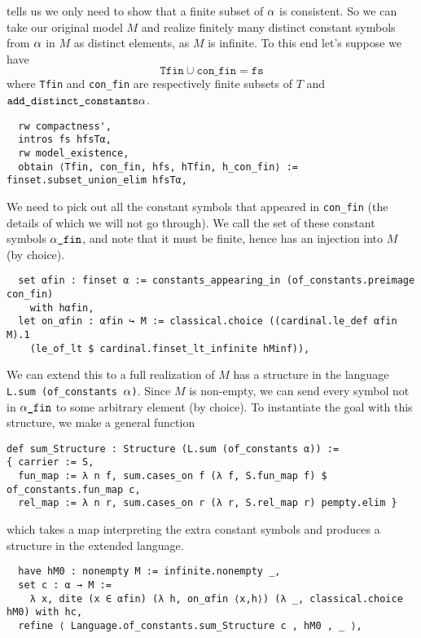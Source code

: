  tells us we only
need to show that a finite subset of $\alpha$ is consistent.
So we can take our original model $M$ and realize finitely many
distinct constant symbols from $\alpha$ in $M$ as distinct elements,
as $M$ is infinite.
To this end let's suppose we have
\[\texttt{Tfin} \cup \texttt{con\_fin} = \texttt{fs}\]
where \texttt{Tfin} and \texttt{con\_fin} are respectively
finite subsets of $T$ and $\texttt{add\_distinct\_constants} \alpha$.

\begin{lstlisting}
  rw compactness',
  intros fs hfsTα,
  rw model_existence,
  obtain ⟨Tfin, con_fin, hfs, hTfin, h_con_fin⟩ := finset.subset_union_elim hfsTα, \end{lstlisting}

We need to pick out all the constant symbols that appeared in
\texttt{con\_fin} (the details of which we will not go through).
We call the set of these constant symbols $\alpha\texttt{\_fin}$,
and note that it must be finite,
hence has an injection into $M$ (by choice).



\begin{lstlisting}
  set αfin : finset α := constants_appearing_in (of_constants.preimage con_fin)
    with hαfin,
  let on_αfin : αfin ↪ M := classical.choice ((cardinal.le_def αfin M).1
    (le_of_lt $ cardinal.finset_lt_infinite hMinf)),
\end{lstlisting}

We can extend this to a full realization of $M$ has a structure in the
language \texttt{L.sum (of\_constants $\alpha$)}.
Since $M$ is non-empty, we can send every symbol not in $\alpha\texttt{\_fin}$
to some arbitrary element (by choice).
To instantiate the goal with this structure, we make a general function

\begin{lstlisting}
def sum_Structure : Structure (L.sum (of_constants α)) :=
{ carrier := S,
  fun_map := λ n f, sum.cases_on f (λ f, S.fun_map f) $ of_constants.fun_map c,
  rel_map := λ n r, sum.cases_on r (λ r, S.rel_map r) pempty.elim } \end{lstlisting}

which takes a map interpreting the extra constant symbols
and produces a structure in the extended language.

\begin{lstlisting}
  have hM0 : nonempty M := infinite.nonempty _,
  set c : α → M :=
    λ x, dite (x ∈ αfin) (λ h, on_αfin ⟨x,h⟩) (λ _, classical.choice hM0) with hc,
  refine ⟨ Language.of_constants.sum_Structure c , hM0 , _ ⟩, \end{lstlisting}

